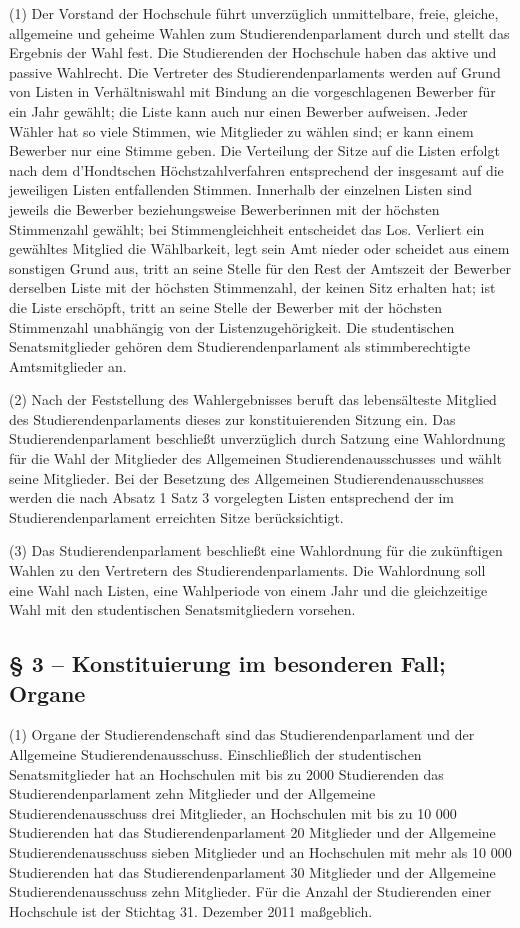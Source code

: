 \documentclass[
10pt,
a4paper,
twoside,								%
titlepage=false,							%
draft=false								%
]{scrartcl}
\begin{document}
(1) Der Vorstand der Hochschule führt unverzüglich unmittelbare, freie, gleiche, allgemeine und geheime Wahlen zum Studierendenparlament durch und stellt das Ergebnis der Wahl fest. Die Studierenden der Hochschule haben das aktive und passive Wahlrecht. Die Vertreter des Studierendenparlaments werden auf Grund von Listen in Verhältniswahl mit Bindung an die vorgeschlagenen Bewerber für ein Jahr gewählt; die Liste kann auch nur einen Bewerber aufweisen. Jeder Wähler hat so viele Stimmen, wie Mitglieder zu wählen sind; er kann einem Bewerber nur eine Stimme geben. Die Verteilung der Sitze auf die Listen erfolgt nach dem d’Hondtschen Höchstzahlverfahren entsprechend der insgesamt auf die jeweiligen Listen entfallenden Stimmen. Innerhalb der einzelnen Listen sind jeweils die Bewerber beziehungsweise Bewerberinnen mit der höchsten Stimmenzahl gewählt; bei Stimmengleichheit entscheidet das Los. Verliert ein gewähltes Mitglied die Wählbarkeit, legt sein Amt nieder oder scheidet aus einem sonstigen Grund aus, tritt an seine Stelle für den Rest der Amtszeit der Bewerber derselben Liste mit der höchsten Stimmenzahl, der keinen Sitz erhalten hat; ist die Liste erschöpft, tritt an seine Stelle der Bewerber mit der höchsten Stimmenzahl unabhängig von der Listenzugehörigkeit. Die studentischen Senatsmitglieder gehören dem Studierendenparlament als stimmberechtigte Amtsmitglieder an.

(2) Nach der Feststellung des Wahlergebnisses beruft das lebensälteste Mitglied des Studierendenparlaments dieses zur konstituierenden Sitzung ein. Das Studierendenparlament beschließt unverzüglich durch Satzung eine Wahlordnung für die Wahl der Mitglieder des Allgemeinen Studierendenausschusses und wählt seine Mitglieder. Bei der Besetzung des Allgemeinen Studierendenausschusses werden die nach Absatz 1 Satz 3 vorgelegten Listen entsprechend der im Studierendenparlament erreichten Sitze berücksichtigt.

(3) Das Studierendenparlament beschließt eine Wahlordnung für die zukünftigen Wahlen zu den Vertretern des Studierendenparlaments. Die Wahlordnung soll eine Wahl nach Listen, eine Wahlperiode von einem Jahr und die gleichzeitige Wahl mit den studentischen Senatsmitgliedern vorsehen.


\subsection*{§ 3 – Konstituierung im besonderen Fall; Organe}

(1) Organe der Studierendenschaft sind das Studierendenparlament und der Allgemeine Studierendenausschuss. Einschließlich der studentischen Senatsmitglieder hat an Hochschulen mit bis zu 2000 Studierenden das Studierendenparlament zehn Mitglieder und der Allgemeine Studierendenausschuss drei Mitglieder, an Hochschulen mit bis zu 10 000 Studierenden hat das Studierendenparlament 20 Mitglieder und der Allgemeine Studierendenausschuss sieben Mitglieder und an Hochschulen mit mehr als 10 000 Studierenden hat das Studierendenparlament 30 Mitglieder und der Allgemeine Studierendenausschuss zehn Mitglieder. Für die Anzahl der Studierenden einer Hochschule ist der Stichtag 31. Dezember 2011 maßgeblich.
\end{document}
